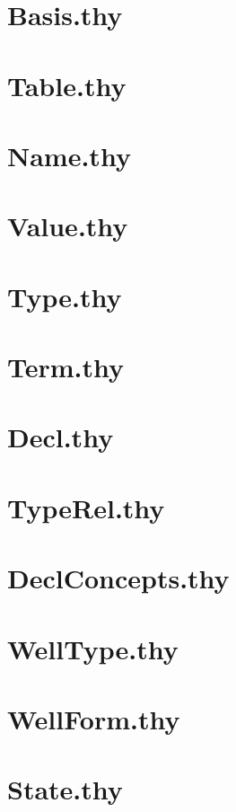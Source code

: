 \documentclass[11pt,a4paper]{book}
\begin{document}
\chapter{Basis.thy}

\chapter{Table.thy}
    

\chapter{Name.thy}

\chapter{Value.thy}     

\chapter{Type.thy}
      
\chapter{Term.thy}
     
\chapter{Decl.thy}
          
\chapter{TypeRel.thy}
   
\chapter{DeclConcepts.thy}
  

\chapter{WellType.thy}

\chapter{WellForm.thy}


\chapter{State.thy}
    
\end{document}
